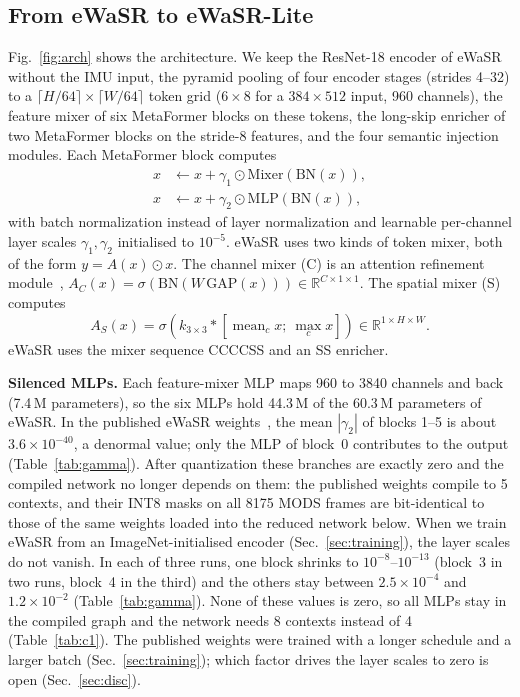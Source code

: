 \documentclass[conference]{IEEEtran}
\begin{document}
\subsection{From eWaSR to eWaSR-Lite}
\label{sec:lite}
Fig.~\ref{fig:arch} shows the architecture. We keep the ResNet-18 encoder of eWaSR without the IMU input, the pyramid pooling of four encoder stages (strides 4--32) to a $\lceil H/64\rceil\times\lceil W/64\rceil$ token grid ($6\times8$ for a $384\times512$ input, 960 channels), the feature mixer of six MetaFormer blocks on these tokens, the long-skip enricher of two MetaFormer blocks on the stride-8 features, and the four semantic injection modules. Each MetaFormer block computes
\begin{align}
x &\leftarrow x + \gamma_1 \odot \mathrm{Mixer}(\mathrm{BN}(x)),\\
x &\leftarrow x + \gamma_2 \odot \mathrm{MLP}(\mathrm{BN}(x)),
\end{align}
with batch normalization instead of layer normalization and learnable per-channel layer scales $\gamma_1,\gamma_2$ initialised to $10^{-5}$. eWaSR uses two kinds of token mixer, both of the form $y = A(x)\odot x$. The channel mixer (C) is an attention refinement module~\cite{yu2018bisenet}, $A_C(x)=\sigma(\mathrm{BN}(W\,\mathrm{GAP}(x)))\in\mathbb{R}^{C\times1\times1}$. The spatial mixer (S) computes
\begin{equation}
A_S(x)=\sigma\!\left(k_{3\times3} * \left[\operatorname{mean}_c x;\ \operatorname{max}_c x\right]\right)\in\mathbb{R}^{1\times H\times W}.
\end{equation}
eWaSR uses the mixer sequence CCCCSS and an SS enricher.

\textbf{Silenced MLPs.} Each feature-mixer MLP maps 960 to 3840 channels and back (7.4\,M parameters), so the six MLPs hold 44.3\,M of the 60.3\,M parameters of eWaSR. In the published eWaSR weights~\cite{tersek2023ewasr}, the mean $|\gamma_2|$ of blocks 1--5 is about $3.6\times10^{-40}$, a denormal value; only the MLP of block~0 contributes to the output (Table~\ref{tab:gamma}). After quantization these branches are exactly zero and the compiled network no longer depends on them: the published weights compile to 5 contexts, and their INT8 masks on all 8175 MODS frames are bit-identical to those of the same weights loaded into the reduced network below. When we train eWaSR from an ImageNet-initialised encoder (Sec.~\ref{sec:training}), the layer scales do not vanish. In each of three runs, one block shrinks to $10^{-8}$--$10^{-13}$ (block~3 in two runs, block~4 in the third) and the others stay between $2.5\times10^{-4}$ and $1.2\times10^{-2}$ (Table~\ref{tab:gamma}). None of these values is zero, so all MLPs stay in the compiled graph and the network needs 8 contexts instead of 4 (Table~\ref{tab:c1}). The published weights were trained with a longer schedule and a larger batch (Sec.~\ref{sec:training}); which factor drives the layer scales to zero is open (Sec.~\ref{sec:disc}).
\end{document}
